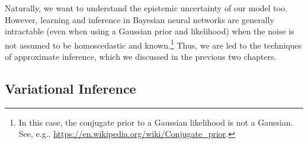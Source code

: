 Naturally, we want to understand the epistemic uncertainty of our model too.
However, learning and inference in Bayesian neural networks are generally intractable (even when using a Gaussian prior and likelihood) when the noise is not assumed to be homoscedastic and known.\footnote{In this case, the conjugate prior to a Gaussian likelihood is not a Gaussian. See, e.g., \url{https://en.wikipedia.org/wiki/Conjugate_prior}.}
Thus, we are led to the techniques of approximate inference, which we discussed in the previous two chapters.

\subsection{Variational Inference}\label{sec:bnn:approximate_inference:vi}

